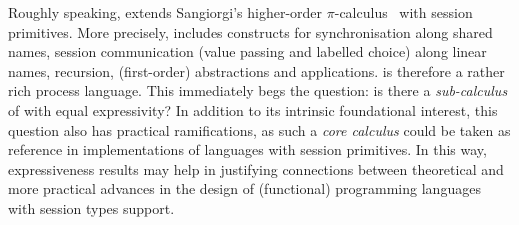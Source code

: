 Roughly speaking, 
  \HOp %
extends Sangiorgi's higher-order $\pi$-calculus~\cite{SangiorgiD:expmpa} with session primitives.
More precisely, \HOp
includes
constructs for 
synchronisation along shared names, 
session communication (value passing and labelled choice) along linear names,
recursion, 
 (first-order) abstractions %
 and applications.
\HOp is therefore a rather rich process language. This immediately begs the question:
is there a \emph{sub-calculus} of \HOp with equal expressivity? %
In addition to its intrinsic foundational interest, this question also has practical ramifications, 
as such a \emph{core calculus} could be taken as reference in 
implementations of languages with session primitives.
In this way, expressiveness results may help in justifying connections 
between theoretical and more
practical advances in the design of (functional) programming languages with session types support.



